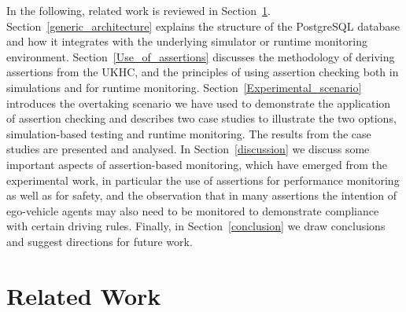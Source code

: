 In the following, related work is reviewed in Section~\ref{Related_work}. Section~\ref{generic_architecture} explains the structure of the PostgreSQL database and how it integrates with the underlying simulator or runtime monitoring environment. Section~\ref{Use_of_assertions} discusses the  methodology of deriving assertions from the UKHC, and the principles of using %
assertion checking
both in simulations and for runtime monitoring. Section~\ref{Experimental_scenario} introduces the overtaking scenario we have used to demonstrate the application of assertion %
checking
and describes two case studies to illustrate the two options, simulation-based testing and runtime monitoring. The results from the case studies are presented and analysed. In Section~\ref{discussion} we discuss some important aspects of assertion-based monitoring, which have emerged from the experimental work, in particular the use of assertions for performance monitoring as well as for safety, and the observation that in many assertions the intention of ego-vehicle agents may also need to be monitored to demonstrate compliance with certain driving rules. Finally, in Section~\ref{conclusion} we draw conclusions and suggest directions for future work.




\section{Related Work}
\label{Related_work}

